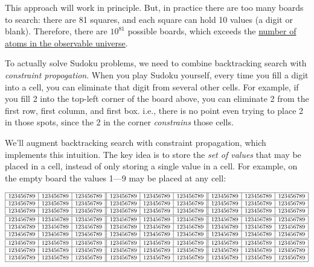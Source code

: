 \documentclass[9pt]{extbook}
\begin{document}
This approach will work in principle. But, in practice there are too many
boards to search: there are 81 squares, and each square can hold 10 values
(a digit or blank). Therefore, there are $10^{81}$ possible boards, which
exceeds the
\href{http://en.wikipedia.org/wiki/Observable_universe#Matter_content_.E2.80.94_number_of_atoms}{number of atoms in the observable universe}.

To actually solve Sudoku problems, we need to combine backtracking search
with \emph{constraint propogation}. When you play Sudoku yourself, every
time you fill a digit into a cell, you can eliminate that digit from
several other cells. For example, if you fill 2 into the top-left corner
of the board above, you can eliminate 2 from the first row, first column,
and first box. i.e., there is no point even trying to place 2 in those
spots, since the 2 in the corner \emph{constrains} those cells.


We'll augment backtracking search with constraint propagation, which
implements this intuition. The key idea is to store 
the \emph{set of values} that may be placed in a cell, instead of only storing
a single value in a cell. For
example, on the empty board the values 1---9 may be placed at any cell:

\[
\small
\begin{array}{|c|c|c||c|c|c||c|c|c|}
\hline
123456789 & 123456789 & 123456789 & 123456789 & 123456789 & 123456789 & 123456789 & 123456789 & 123456789 \\
\hline
123456789 & 123456789 & 123456789 & 123456789 & 123456789 & 123456789 & 123456789 & 123456789 & 123456789 \\
\hline
123456789 & 123456789 & 123456789 & 123456789 & 123456789 & 123456789 & 123456789 & 123456789 & 123456789 \\
\hline \hline
123456789 & 123456789 & 123456789 & 123456789 & 123456789 & 123456789 & 123456789 & 123456789 & 123456789 \\
\hline
123456789 & 123456789 & 123456789 & 123456789 & 123456789 & 123456789 & 123456789 & 123456789 & 123456789 \\
\hline
123456789 & 123456789 & 123456789 & 123456789 & 123456789 & 123456789 & 123456789 & 123456789 & 123456789 \\
\hline \hline
123456789 & 123456789 & 123456789 & 123456789 & 123456789 & 123456789 & 123456789 & 123456789 & 123456789 \\
\hline
123456789 & 123456789 & 123456789 & 123456789 & 123456789 & 123456789 & 123456789 & 123456789 & 123456789 \\
\hline
123456789 & 123456789 & 123456789 & 123456789 & 123456789 & 123456789 & 123456789 & 123456789 & 123456789 \\
\hline
\end{array}
\]
\end{document}
